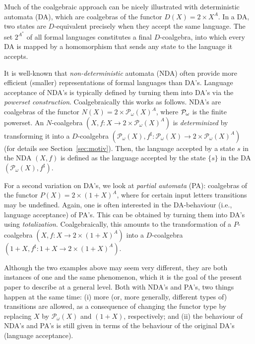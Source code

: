 \documentclass{LMCS}
\def\pow#1{{\mathcal P_\omega}#1}
\begin{document}
Much of the coalgebraic approach can be nicely illustrated with
deterministic automata (DA), which are coalgebras of the functor
\mbox{$D(X) = 2 \times X^A$}. In a DA, two states are $D$-equivalent
precisely when they accept the same language. The set $2^{A^*}$ of
all formal languages constitutes a final $D$-coalgebra, into which
every DA is mapped by a homomorphism that sends any state to the
language it accepts.

It is well-known that \emph{non-deterministic} automata (NDA)
often provide more efficient (smaller) representations of
formal languages than DA's. Language acceptance of NDA's is typically
defined by turning them into DA's via the \emph{powerset construction}.
Coalgebraically this works as follows.
NDA's are coalgebras of the functor $N(X) = 2 \times \pow(X)^A$, where
$\pow$ is the finite powerset. An $N$-coalgebra $(X, f \colon X \to 2 \times \pow(X)^A)$
is \emph{determinized} by transforming it into a $D$-coalgebra
$(\pow(X), f^\sharp \colon \pow(X) \to 2 \times \pow(X)^A)$
(for details see Section~\ref{sec:motiv}).
Then, the language accepted by a state $s$ in the NDA $(X,f)$
is defined as the language accepted by the state $\{s\}$ in the DA
$(\pow(X), f^\sharp )$.

For a second variation on DA's, we look at
\emph{partial automata} (PA): coalgebras of the functor
$P(X) = 2 \times (1+X)^A$, where for certain input letters
transitions may be undefined. Again, one is often interested
in the DA-behaviour (i.e., language acceptance) of PA's. This
can be obtained  by turning them into DA's using \emph{totalization}.
Coalgebraically, this amounts to the transformation of a $P$-coalgebra
$(X, f \colon X \to 2 \times (1+X)^A )$ into a $D$-coalgebra
$(1+X, f^\sharp \colon 1+X \to 2 \times (1+X)^A )$.

Although the two examples above may seem very different, they
are both instances of one and the same phenomenon, which it is
the goal of the present paper to describe at a general level.
Both with NDA's and PA's, two things happen at the
same time: (i) more (or, more generally, different types of)
transitions are allowed, as a consequence of changing
the functor type by replacing $X$ by $\pow(X)$ and $(1+ X)$, respectively;
and (ii) the behaviour of NDA's and PA's is still given in
terms of the behaviour of the original DA's (language acceptance).
\end{document}
